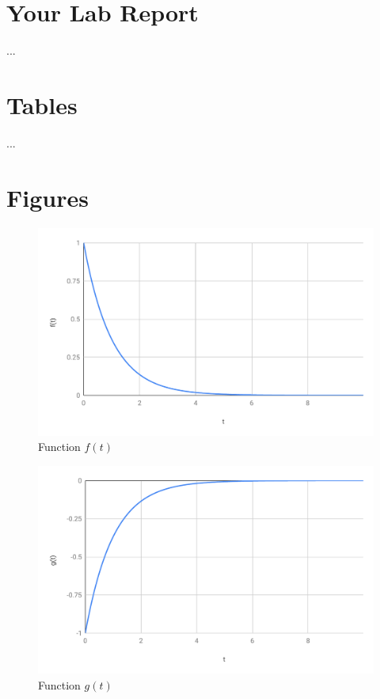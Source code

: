 \section{Your Lab Report}
...
\newpage
\section{Tables}
...
\newpage
\section{Figures}
\begin{figure}[ht]
    \centering
    \includegraphics[scale=0.74]{image/05-RC-RL/f.pdf}
    \caption{Function $f(t)$}
    \label{figure.05.f}
\end{figure}
\begin{figure}[ht]
    \centering
    \includegraphics[scale=0.74]{image/05-RC-RL/g.pdf}
    \caption{Function $g(t)$}
    \label{figure.05.g}
\end{figure}
